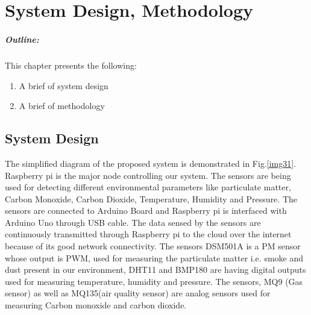 \chapter{System Design, Methodology}\label{chap3}

\vspace*{50 ex}

\paragraph*{Outline:} This chapter presents the following:
\begin{enumerate}
\setlength{\itemsep}{-0.3em}
\item A brief of system design
\item A brief of methodology
\end{enumerate}
\newpage



\section{System Design }


The simplified diagram of the proposed system is
demonstrated in Fig.\ref{img31}. Raspberry pi is the major node
controlling our system. The sensors are being used for
detecting different environmental parameters like particulate
matter, Carbon Monoxide, Carbon Dioxide, Temperature,
Humidity and Pressure. The sensors are connected to Arduino
Board and Raspberry pi is interfaced with Arduino Uno
through USB cable. The data sensed by the sensors are
continuously transmitted through Raspberry pi to the cloud
over the internet because of its good network connectivity.
The sensors DSM501A is a PM sensor whose output is PWM,
used for measuring the particulate matter i.e. smoke and dust
present in our environment, DHT11 and BMP180 are having
digital outputs used for measuring temperature, humidity and
pressure. The sensors, MQ9 (Gas sensor) as well as
MQ135(air quality sensor) are analog sensors used for
measuring Carbon monoxide and carbon dioxide.

